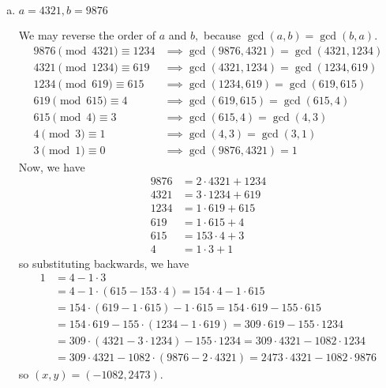 \documentclass{article}
\begin{document}
\begin{itemize}
\begin{enumerate}[(a)]
			\item $a=4321, b=9876$
				\begin{soln}
					We may reverse the order of $a$ and $b,$ because $\gcd(a, b) = \gcd(b, a).$ 
					\begin{align*}
						9876 \pmod{4321} \equiv 1234 &\implies \gcd(9876, 4321) = \gcd(4321, 1234) \\
						4321 \pmod{1234} \equiv 619 &\implies \gcd(4321, 1234) = \gcd(1234, 619) \\
						1234\pmod{619} \equiv 615 &\implies \gcd(1234, 619) = \gcd(619, 615) \\
						619 \pmod{615} \equiv 4 &\implies \gcd(619, 615) = \gcd(615, 4) \\
						615 \pmod 4 \equiv 3 &\implies \gcd(615, 4) = \gcd(4, 3) \\
						4 \pmod 3 \equiv 1 &\implies \gcd(4, 3) = \gcd(3, 1) \\
						3 \pmod 1 \equiv 0&\implies \gcd(9876, 4321) = \boxed1
					\end{align*}
					Now, we have
					\begin{align*}
						9876 &= 2\cdot 4321 + 1234 \\
						4321 &= 3\cdot 1234 + 619 \\
						1234 &= 1\cdot 619 + 615 \\
						619 &= 1\cdot 615 + 4 \\
						615 &= 153\cdot 4 + 3 \\
						4 &= 1\cdot3 + 1
					\end{align*}
					so substituting backwards, we have
					\begin{align*}
						1 &= 4-1\cdot 3 \\
						&= 4-1\cdot(615 - 153\cdot 4) = 154\cdot 4 - 1\cdot 615 \\
						&= 154\cdot(619-1\cdot 615) - 1\cdot 615 = 154\cdot 619 - 155\cdot 615 \\
						&= 154\cdot619 - 155\cdot(1234-1\cdot 619) = 309\cdot 619 - 155\cdot 1234 \\
						&= 309\cdot(4321-3\cdot 1234) - 155\cdot 1234 = 309\cdot 4321 - 1082\cdot 1234 \\
						&= 309\cdot 4321 - 1082\cdot(9876 - 2\cdot 4321) = 2473\cdot 4321 - 1082\cdot 9876
					\end{align*}
					so $(x, y) = (-1082, 2473).$
				\end{soln}


\end{enumerate}
\end{itemize}
\end{document}
